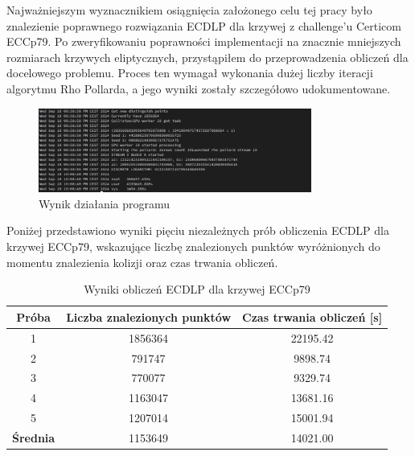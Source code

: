 Najważniejszym wyznacznikiem osiągnięcia założonego celu tej pracy było
znalezienie poprawnego rozwiązania ECDLP dla krzywej z challenge'u Certicom ECCp79.
Po zweryfikowaniu poprawności implementacji na znacznie mniejszych rozmiarach
krzywych eliptycznych, przystąpiłem do przeprowadzenia obliczeń dla docelowego
problemu. Proces ten wymagał wykonania dużej liczby iteracji algorytmu Rho Pollarda,
a jego wyniki zostały szczegółowo udokumentowane.

\begin{figure}[H]
    \centering
    \includegraphics[width=0.8\textwidth]{img/first_attempt.png}
    \caption{Wynik działania programu}
    \label{fig:first_attempt}
\end{figure}

Poniżej przedstawiono wyniki pięciu niezależnych prób obliczenia ECDLP dla
krzywej ECCp79, wskazujące liczbę znalezionych punktów wyróżnionych do momentu
znalezienia kolizji oraz czas trwania obliczeń.

\begin{table}[H]
    \centering
    \caption{Wyniki obliczeń ECDLP dla krzywej ECCp79}
    \label{tab:eccp79_results}
    \begin{tabular}{|c|c|c|}
        \hline
        \textbf{Próba}   & \textbf{Liczba znalezionych punktów} &
        \textbf{Czas trwania obliczeń [s]}                                      \\ \hline
        1                & 1856364                             & 22195.42      \\ \hline
        2                & 791747                              & 9898.74       \\ \hline
        3                & 770077                              & 9329.74       \\ \hline
        4                & 1163047                             & 13681.16      \\ \hline
        5                & 1207014                             & 15001.94      \\ \hline
        \textbf{Średnia} & 1153649                             & 14021.00      \\ \hline
    \end{tabular}
\end{table}



